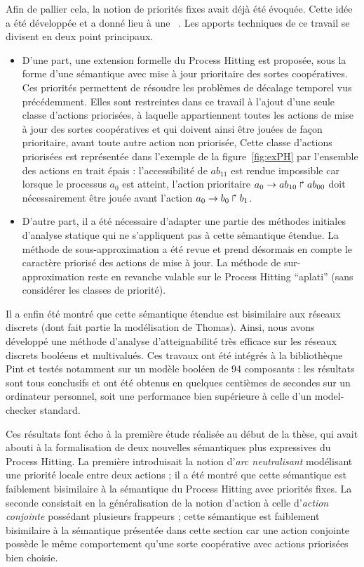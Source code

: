 Afin de pallier cela, la notion de priorités fixes avait déjà été évoquée.
Cette idée a été développée et a donné lieu à une ~\cite{FPMR13-CS3Bio}.
Les apports techniques de ce travail se divisent en deux point principaux.
\begin{itemize}
  \item D'une part, une extension formelle du Process Hitting est proposée, sous la forme d'une sémantique avec mise à jour prioritaire des sortes coopératives.
  Ces priorités permettent de résoudre les problèmes de décalage temporel vus précédemment.
  Elles sont restreintes dans ce travail à l'ajout d'une seule classe d'actions priorisées, à laquelle appartiennent toutes les actions de mise à jour des sortes coopératives et qui doivent ainsi être jouées de façon prioritaire, avant toute autre action non priorisée,
  Cette classe d'actions priorisées est représentée dans l'exemple de la figure~\ref{fig:exPH} par l'ensemble des actions en trait épais :
  l'accessibilité de $ab_{11}$ est rendue impossible car lorsque le processus $a_0$ est atteint, l'action prioritaire $a_0\rightarrow ab_{10}\Rsh ab_{00}$ doit nécessairement être jouée avant l'action $a_0\rightarrow b_0\Rsh b_1$.
  \item D'autre part, il a été nécessaire d'adapter une partie des méthodes initiales d'analyse statique qui ne s'appliquent pas à cette sémantique étendue.
  La méthode de sous-approximation a été revue et prend désormais en compte le caractère priorisé des actions de mise à jour.
  La méthode de sur-approximation reste en revanche valable sur le Process Hitting “aplati” (\ie sans considérer les classes de priorité).
\end{itemize}
Il a enfin été montré que cette sémantique étendue est bisimilaire aux réseaux discrets (dont fait partie la modélisation de Thomas).
Ainsi, nous avons développé une méthode d'analyse d'atteignabilité très efficace sur les réseaux discrets booléens et multivalués.
Ces travaux ont été intégrés à la bibliothèque Pint et testés notamment sur un modèle booléen de 94 composants :
les résultats sont tous conclusifs et ont été obtenus en quelques centièmes de secondes sur un ordinateur personnel,
soit une performance bien supérieure à celle d'un model-checker standard.

Ces résultats font écho à la première étude réalisée au début de la thèse, qui avait abouti à la formalisation de deux nouvelles sémantiques plus expressives du Process Hitting.
La première introduisait la notion d'\emph{arc neutralisant} modélisant une priorité locale entre deux actions ;
il a été montré que cette sémantique est faiblement bisimilaire à la sémantique du Process Hitting avec priorités fixes.
La seconde consistait en la généralisation de la notion d'action à celle d'\emph{action conjointe} possédant plusieurs frappeurs ;
cette sémantique est faiblement bisimilaire à la sémantique présentée dans cette section car une action conjointe possède le même comportement qu'une sorte coopérative avec actions priorisées bien choisie.



